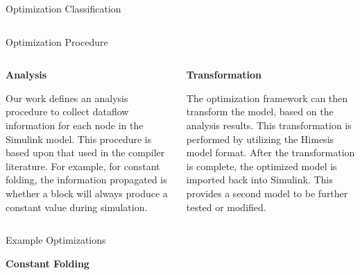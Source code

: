 \documentclass[final,hyperref={pdfpagelabels=false}]{beamer}
\begin{document}
\begin{frame}{}
\begin{block}{Optimization Classification}
\begin{columns}[t]
                  \end{columns}
            \end{block}
	
        \begin{block}{Optimization Procedure}
        \vspace{-1.5cm}
        \begin{columns}[t]
         \begin{column}{.485\linewidth}
         \vspace{-.8cm}
         \small
       \begin{center}\textbf{Analysis}\end{center}
       \footnotesize
       Our work defines an analysis procedure to collect dataflow information for each node in the Simulink model. This procedure is based upon that used in the compiler literature. For example, for constant folding, the information propagated is whether a block will always produce a constant value during simulation.
       \end{column}
       \begin{column}{.485\linewidth}
       \vspace{-.8cm}
       \small
      \begin{center}\textbf{Transformation}\end{center}
        \footnotesize
        The optimization framework can then transform the model, based on the analysis results. This transformation is performed by utilizing the Himesis model format. After the transformation is complete, the optimized model is imported back into Simulink. This provides a second model to be further tested or modified.
        \end{column}
              \end{columns}
        \end{block}
      
      \vspace{-1.5cm}
    \begin{columns}[t]
    \centering
      \begin{column}{.585\linewidth}
        \begin{block}{Example Optimizations}
         \vspace{-.8cm}
        \small
        \begin{center}\textbf{Constant Folding}\end{center}
        
        \begin{columns}[c]
        \begin{column}{.485\linewidth}
        \begin{center}
        

\end{center}
\end{column}
\end{columns}
\end{block}
\end{column}
\end{columns}
\end{frame}
\end{document}
